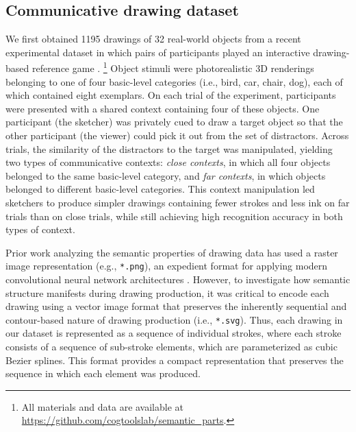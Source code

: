 \documentclass[10pt,letterpaper]{article}
\begin{document}
\subsection{Communicative drawing dataset}
We first obtained 1195 drawings of 32 real-world objects from a recent experimental dataset in which pairs of participants played an interactive drawing-based reference game . \footnote{All materials and data are available at \url{https://github.com/cogtoolslab/semantic_parts}.}
Object stimuli were photorealistic 3D renderings belonging to one of four basic-level categories (i.e., bird, car, chair, dog), each of which contained eight exemplars. %
On each trial of the experiment, participants were presented with a shared context containing four of these objects. 
One participant (the sketcher) was privately cued to draw a target object so that the other participant (the viewer) could pick it out from the set of distractors. %
Across trials, the similarity of the distractors to the target was manipulated, yielding two types of communicative contexts: \textit{close contexts}, in which all four objects belonged to the same basic-level category, and \textit{far contexts}, in which objects belonged to different basic-level categories. %
This context manipulation led sketchers to produce simpler drawings containing fewer strokes and less ink on far trials than on close trials, while still achieving high recognition accuracy in both types of context.%
 

Prior work analyzing the semantic properties of drawing data has used a raster image representation (e.g., \texttt{*.png}), an expedient format for applying modern convolutional neural network architectures . 
However, to investigate how semantic structure manifests during drawing production, it was critical to encode each drawing using a vector image format that preserves the inherently sequential and contour-based nature of drawing production (i.e., \texttt{*.svg}). 
Thus, each drawing in our dataset is represented as a sequence of individual strokes, where each stroke consists of a sequence of sub-stroke elements, which are parameterized as cubic Bezier splines.
This format provides a compact representation that preserves the sequence in which each element was produced.
\end{document}
